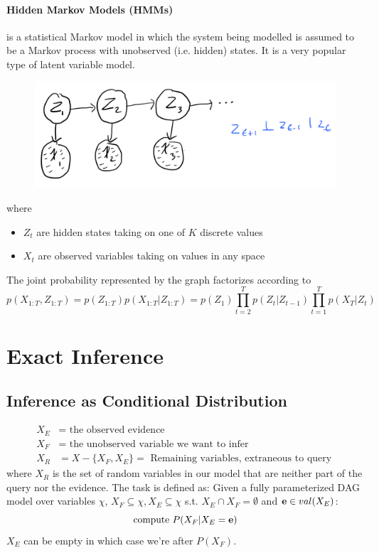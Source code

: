 \documentclass[11pt]{article}
\begin{document}
\paragraph{Hidden Markov Models (HMMs)}
 is a statistical Markov model in which the system being modelled is assumed to be a Markov process with unobserved (i.e. hidden) states. It is a very popular type of latent variable model.
\begin{figure}[H]
	\centering
	\includegraphics[scale=0.6]{p2.png}
\end{figure}
where 
\begin{itemize}
	\item $Z_t$ are hidden states taking on one of $K$ discrete values
	\item $X_t$ are observed variables taking on values in any space
\end{itemize}
The joint probability represented by the graph factorizes according to
$$p(X_{1:T}, Z_{1:T}) = p(Z_{1:T})p(X_{1:T}|Z_{1:T}) = p(Z_1)\prod_{t=2}^Tp(Z_t|Z_{t-1})\prod_{t=1}^T p(X_T|Z_t)$$

\section{Exact Inference}
\subsection{Inference as Conditional Distribution}
\notation
\begin{align*}
	X_E &= \text{ the observed evidence} \\
	X_F &= \text{ the unobserved variable we want to infer} \\
	X_R &= X - \{X_F, X_E\} = \text{ Remaining variables, extraneous to query }
\end{align*}
where $X_R$ is the set of random variables in our model that are neither part of the query nor the evidence.
The  task is defined as:
Given a fully parameterized DAG model over variables $\chi$, $X_F \subseteq \chi, X_E\subseteq \chi$ s.t. $X_E \cap X_F  = \emptyset$ and $\textbf{e} \in val(X_E)$:
$$\text{compute } P(X_F|X_E = \textbf{e})$$
$X_E$ can be empty in which case we're after $P(X_F)$.
\end{document}
